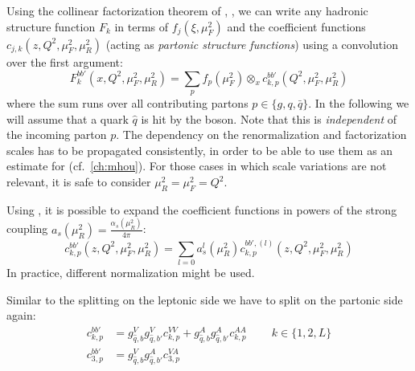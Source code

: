 
Using the collinear factorization theorem of \dis, \cite{Collins:1989gx}, we
can write any hadronic structure function $F_k$ in terms of \pdf
$f_j(\xi,\mu_F^2)$ and the coefficient functions $c_{j,k}(z,
Q^2,\mu_F^2,\mu_R^2)$ (acting as \textit{partonic structure functions}) using a
convolution over the first argument:
\begin{equation}
    F_k^{bb'}(x,Q^2,\mu_F^2,\mu_R^2) = \sum_{p} f_p(\mu_F^2) \otimes_x c_{k,p}^{bb'}(Q^2,\mu_F^2,\mu_R^2)
    \label{eq:dis/sfs-pqcd}
\end{equation}
where the sum runs over all contributing partons $p\in\{g,q,\bar q\}$. In the
following we will assume that a quark $\hat q$ is hit by the boson. Note that
this is \textit{independent} of the incoming parton $p$.
%
The dependency on the renormalization and factorization scales has to be
propagated consistently, in order to be able to use them as an estimate for
\mhou (cf.\ \cref{ch:mhou}).
For those cases in which scale variations are not relevant, it is safe to
consider $\mu_R^2 = \mu_F^2 = Q^2$.

Using \pqcd, it is possible to expand the coefficient functions in powers of
the strong coupling $a_s(\mu_R^2) = \frac{\alpha_s(\mu_R^2)}{4\pi}$:
\begin{equation}
    c_{k,p}^{bb'}(z, Q^2,\mu_F^2,\mu_R^2) = \sum_{l=0} a_s^l(\mu_R^2) c_{k,p}^{bb',(l)}(z, Q^2,\mu_F^2,\mu_R^2)
\end{equation}
In practice, different normalization might be used.

Similar to the splitting on the leptonic side we have to split on the partonic
side again:
\begin{align}
    c_{k,p}^{bb'} &= g_{\hat q,b}^V g_{\hat q,b'}^V c_{k,p}^{VV} + g_{\hat q,b}^A g_{\hat q,b'}^A c_{k,p}^{AA} \qquad~ k\in\{1,2,L\} \\
    c_{3,p}^{bb'} &= g_{\hat q,b}^V g_{\hat q,b'}^A c_{3,p}^{VA}
\end{align}

